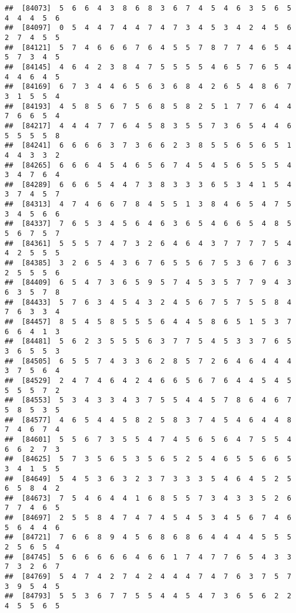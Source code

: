 \documentclass[
]{book}
\begin{document}
\begin{verbatim}
##  [84073]  5  6  6  4  3  8  6  8  3  6  7  4  5  4  6  3  5  6  5  4  4  4  5  6
##  [84097]  0  5  4  4  7  4  4  7  4  7  3  4  5  3  4  2  4  5  6  2  7  4  5  5
##  [84121]  5  7  4  6  6  6  7  6  4  5  5  7  8  7  7  4  6  5  4  5  7  3  4  5
##  [84145]  4  6  4  2  3  8  4  7  5  5  5  5  4  6  5  7  6  5  4  4  4  6  4  5
##  [84169]  6  7  3  4  4  6  5  6  3  6  8  4  2  6  5  4  8  6  7  3  1  5  5  4
##  [84193]  4  5  8  5  6  7  5  6  8  5  8  2  5  1  7  7  6  4  4  7  6  6  5  4
##  [84217]  4  4  4  7  7  6  4  5  8  3  5  5  7  3  6  5  4  4  6  5  5  5  5  8
##  [84241]  6  6  6  6  3  7  3  6  6  2  3  8  5  5  6  5  6  5  1  4  4  3  3  2
##  [84265]  6  6  6  4  5  4  6  5  6  7  4  5  4  5  6  5  5  5  4  3  4  7  6  4
##  [84289]  6  6  6  5  4  4  7  3  8  3  3  3  6  5  3  4  1  5  4  3  7  4  5  7
##  [84313]  4  7  4  6  6  7  8  4  5  5  1  3  8  4  6  5  4  7  5  3  4  5  6  6
##  [84337]  7  6  5  3  4  5  6  4  6  3  6  5  4  6  6  5  4  8  5  5  6  7  5  7
##  [84361]  5  5  5  7  4  7  3  2  6  4  6  4  3  7  7  7  7  5  4  4  2  5  5  5
##  [84385]  3  2  6  5  4  3  6  7  6  5  5  6  7  5  3  6  7  6  3  2  5  5  5  6
##  [84409]  6  5  4  7  3  6  5  9  5  7  4  5  3  5  7  7  9  4  3  6  3  5  7  8
##  [84433]  5  7  6  3  4  5  4  3  2  4  5  6  7  5  7  5  5  8  4  7  6  3  3  4
##  [84457]  8  5  4  5  8  5  5  5  6  4  4  5  8  6  5  1  5  3  7  6  6  4  1  3
##  [84481]  5  6  2  3  5  5  5  6  3  7  7  5  4  5  3  3  7  6  5  3  6  5  5  3
##  [84505]  6  5  5  7  4  3  3  6  2  8  5  7  2  6  4  6  4  4  4  3  7  5  6  4
##  [84529]  2  4  7  4  6  4  2  4  6  6  5  6  7  6  4  4  5  4  5  5  5  5  7  2
##  [84553]  5  3  4  3  3  4  3  7  5  5  4  4  5  7  8  6  4  6  7  5  8  5  3  5
##  [84577]  4  6  5  4  4  5  8  2  5  8  3  7  4  5  4  6  4  4  8  7  4  6  7  4
##  [84601]  5  5  6  7  3  5  5  4  7  4  5  6  5  6  4  7  5  5  4  6  6  2  7  3
##  [84625]  5  7  3  5  6  5  3  5  6  5  2  5  4  6  5  5  6  6  5  3  4  1  5  5
##  [84649]  5  4  5  3  6  3  2  3  7  3  3  3  5  4  6  4  5  2  5  6  5  8  4  2
##  [84673]  7  5  4  6  4  4  1  6  8  5  5  7  3  4  3  3  5  2  6  7  7  4  6  5
##  [84697]  2  5  5  8  4  7  4  7  4  5  4  5  3  4  5  6  7  4  6  5  6  4  4  6
##  [84721]  7  6  6  8  9  4  5  6  8  6  8  6  4  4  4  4  5  5  5  2  5  6  5  4
##  [84745]  5  6  6  6  6  6  4  6  6  1  7  4  7  7  6  5  4  3  3  7  3  2  6  7
##  [84769]  5  4  7  4  2  7  4  2  4  4  4  7  4  7  6  3  7  5  7  3  9  5  4  5
##  [84793]  5  5  3  6  7  7  5  5  4  4  5  4  7  3  6  5  6  2  2  4  5  5  6  5

\end{verbatim}
\end{document}
